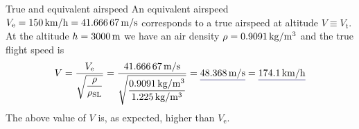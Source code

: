 \documentclass[[12pt,twoside]{book}
\begin{document}
%

%
\begin{myExampleX}{True and equivalent airspeed}{}%
\label{example:Equivalent:Airspeed:Basic:A}
%
\noindent
An equivalent airspeed
$V_\mathrm{e}
 =\SI[round-precision=0]{\myFlightSpeedEASKMH}{km/h}
 =\SI[round-precision=1]{\myFlightSpeedEASMTSec}{m/s}$
corresponds to a true airspeed at altitude $V\equiv V_\mathrm{t}$.
%
At the altitude $h=\SI[round-precision=0]{\myAltitudeMT}{m}$ we have an air density
$\rho=\SI[round-precision=3]{\myAirDensityKGMTcubed}{kg/m^3}$ and the
true flight speed is
\[
V = 
  \frac{ V_\text{e} }{ \sqrt{\dfrac{\rho}{\rho_\mathrm{SL}}} }
  = 
  \frac{
    \SI[round-precision=1]{\myFlightSpeedEASMTSec}{m/s}
  }{
    \sqrt{
      \dfrac{
        \SI[round-precision=3]{\myAirDensityKGMTcubed}{kg/m^3}
      }{
        \SI[round-precision=3]{\myISAAirDensitySeaLevelKGMTcubed}{kg/m^3}
      }
    }
  }
= 
  \mathunderline{mydarkblue}{ \SI[round-precision=1]{\myFlightSpeedMTSec}{\meter/\second} }
  = \mathunderline{mydarkblue}{ \SI[round-precision=1]{\myFlightSpeedKMH}{\kilo\meter/\hour} }
\]
%
The above value of $V$ is, as expected, higher than $V_\mathrm{e}$.

\end{myExampleX}
%
\end{document}
